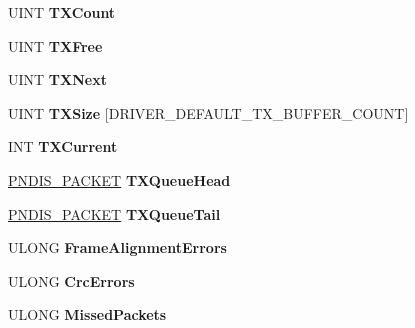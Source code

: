 \begin{DoxyCompactItemize}
\mbox{\label{struct___n_i_c___a_d_a_p_t_e_r_a78a84d4b38f5e845b49083b30a5557e7}} 
U\+I\+NT {\bfseries T\+X\+Count}
\item 
\mbox{\label{struct___n_i_c___a_d_a_p_t_e_r_a0ffef4e90d23d3a113b9a210ac02d32d}} 
U\+I\+NT {\bfseries T\+X\+Free}
\item 
\mbox{\label{struct___n_i_c___a_d_a_p_t_e_r_afe895e8b0e06bf4dfd5ecaf1c0bc9830}} 
U\+I\+NT {\bfseries T\+X\+Next}
\item 
\mbox{\label{struct___n_i_c___a_d_a_p_t_e_r_aad4247c02e39679e52a9c4818be30871}} 
U\+I\+NT {\bfseries T\+X\+Size} \mbox{[}D\+R\+I\+V\+E\+R\+\_\+\+D\+E\+F\+A\+U\+L\+T\+\_\+\+T\+X\+\_\+\+B\+U\+F\+F\+E\+R\+\_\+\+C\+O\+U\+NT\mbox{]}
\item 
\mbox{\label{struct___n_i_c___a_d_a_p_t_e_r_ab71c16aeef600bbde426b404cd1788ba}} 
I\+NT {\bfseries T\+X\+Current}
\item 
\mbox{\label{struct___n_i_c___a_d_a_p_t_e_r_ad8e48646ba2ef034478161fcf00717a5}} 
\hyperlink{struct___n_d_i_s___p_a_c_k_e_t}{P\+N\+D\+I\+S\+\_\+\+P\+A\+C\+K\+ET} {\bfseries T\+X\+Queue\+Head}
\item 
\mbox{\label{struct___n_i_c___a_d_a_p_t_e_r_a70247e768bf537beea03ac2bcae68af6}} 
\hyperlink{struct___n_d_i_s___p_a_c_k_e_t}{P\+N\+D\+I\+S\+\_\+\+P\+A\+C\+K\+ET} {\bfseries T\+X\+Queue\+Tail}
\item 
\mbox{\label{struct___n_i_c___a_d_a_p_t_e_r_ab0b5b8da2c80b3b2f953c1a4cffb50c3}} 
U\+L\+O\+NG {\bfseries Frame\+Alignment\+Errors}
\item 
\mbox{\label{struct___n_i_c___a_d_a_p_t_e_r_afac28469a42280990c036532fc64d57c}} 
U\+L\+O\+NG {\bfseries Crc\+Errors}
\item 
\mbox{\label{struct___n_i_c___a_d_a_p_t_e_r_af2a8ba6cf9deb3e5d9f867522bf4354e}} 
U\+L\+O\+NG {\bfseries Missed\+Packets}

\end{DoxyCompactItemize}
